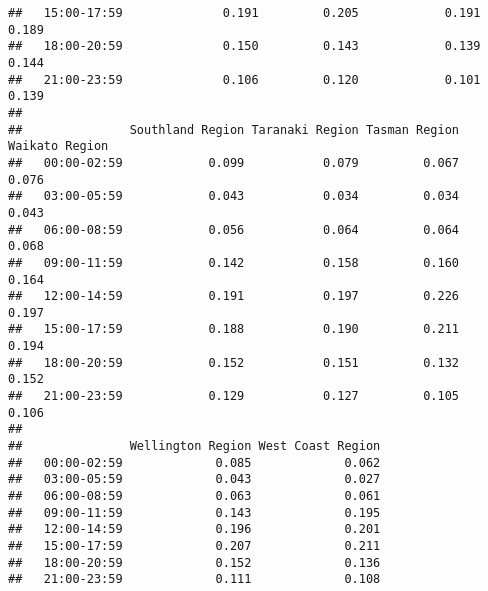 \documentclass[
  10pt,
]{article}
\begin{document}
\begin{verbatim}
##   15:00-17:59              0.191         0.205            0.191        0.189
##   18:00-20:59              0.150         0.143            0.139        0.144
##   21:00-23:59              0.106         0.120            0.101        0.139
##              
##               Southland Region Taranaki Region Tasman Region Waikato Region
##   00:00-02:59            0.099           0.079         0.067          0.076
##   03:00-05:59            0.043           0.034         0.034          0.043
##   06:00-08:59            0.056           0.064         0.064          0.068
##   09:00-11:59            0.142           0.158         0.160          0.164
##   12:00-14:59            0.191           0.197         0.226          0.197
##   15:00-17:59            0.188           0.190         0.211          0.194
##   18:00-20:59            0.152           0.151         0.132          0.152
##   21:00-23:59            0.129           0.127         0.105          0.106
##              
##               Wellington Region West Coast Region
##   00:00-02:59             0.085             0.062
##   03:00-05:59             0.043             0.027
##   06:00-08:59             0.063             0.061
##   09:00-11:59             0.143             0.195
##   12:00-14:59             0.196             0.201
##   15:00-17:59             0.207             0.211
##   18:00-20:59             0.152             0.136
##   21:00-23:59             0.111             0.108
\end{verbatim}
\end{document}
